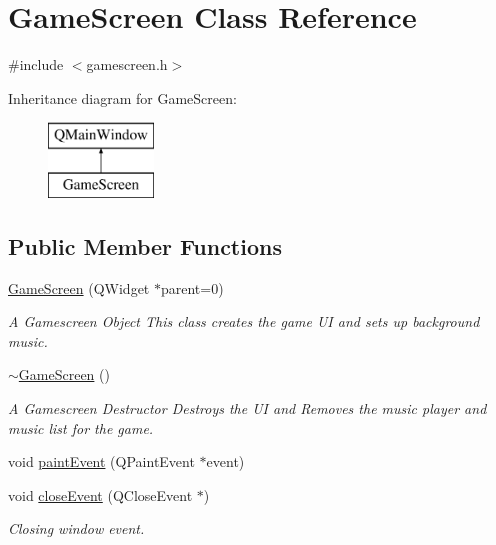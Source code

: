 \hypertarget{class_game_screen}{\section{Game\-Screen Class Reference}
\label{class_game_screen}
}


{\ttfamily \#include $<$gamescreen.\-h$>$}

Inheritance diagram for Game\-Screen\-:\begin{figure}[H]
\begin{center}
\leavevmode
\includegraphics[height=2.000000cm]{class_game_screen}
\end{center}
\end{figure}
\subsection*{Public Member Functions}
\begin{DoxyCompactItemize}
\item 
\hyperlink{class_game_screen_a61ac084a564d45be53337cc364214a60}{Game\-Screen} (Q\-Widget $\ast$parent=0)
\begin{DoxyCompactList}\small\item\em A Gamescreen Object This class creates the game U\-I and sets up background music. \end{DoxyCompactList}\item 
\hyperlink{class_game_screen_a0d25dfce42d72954aab40dbccbf1a0b1}{$\sim$\-Game\-Screen} ()
\begin{DoxyCompactList}\small\item\em A Gamescreen Destructor Destroys the U\-I and Removes the music player and music list for the game. \end{DoxyCompactList}\item 
void \hyperlink{class_game_screen_ab954f12aa342e80cb55dd4e2b8d3afeb}{paint\-Event} (Q\-Paint\-Event $\ast$event)
\item 
void \hyperlink{class_game_screen_af2a5d4c707d0d0f47201eec498b77bd6}{close\-Event} (Q\-Close\-Event $\ast$)
\begin{DoxyCompactList}\small\item\em Closing window event. \end{DoxyCompactList}\end{DoxyCompactItemize}
